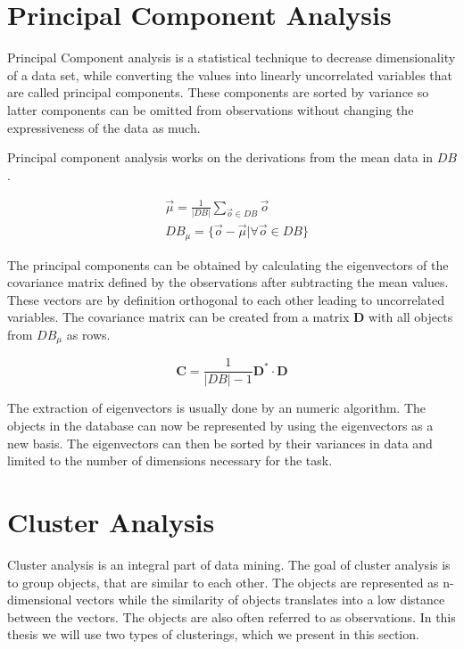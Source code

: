 \documentclass[pdftex,12pt,a4paper]{report}
\begin{document}
\section{Principal Component Analysis}

Principal Component analysis is a statistical technique to decrease dimensionality of a data set, while converting the values into linearly uncorrelated variables that are called principal components. These components are sorted by variance so latter components can be omitted from observations without changing the expressiveness of the data as much.

Principal component analysis works on the derivations from the mean data in $DB$.

\begin{equation}
\begin{split}
& \vec{\mu} = \frac{1}{|DB|} \sum_{\vec{o} \in DB}  \vec{o} \\
& DB_\mu = \{ \vec{o} - \vec{\mu} | \forall \vec{o} \in DB \}
\end{split}
\end{equation}

The principal components can be obtained by calculating the eigenvectors of the covariance matrix defined by the observations after subtracting the mean values. These vectors are by definition orthogonal to each other leading to uncorrelated variables. The covariance matrix can  be created from a matrix $\mathbf{D}$ with all objects from $DB_\mu$ as rows.

\begin{equation}
\mathbf{C} = \frac{1}{|DB|-1} \mathbf{D}^* \cdot \mathbf{D}
\end{equation}

The extraction of eigenvectors is usually done by an numeric algorithm. The objects in the database can now be represented by using the eigenvectors as a new basis. The eigenvectors can then be sorted by their variances in data and limited to the number of dimensions necessary for the task.

\section{Cluster Analysis}

Cluster analysis is an integral part of data mining. The goal of cluster analysis is to group objects, that are similar to each other. The objects are represented as n-dimensional vectors while the similarity of objects translates into a low distance between the vectors. The objects are also often referred to as observations. In this thesis we will use two types of clusterings, which we present in this section.
\end{document}
